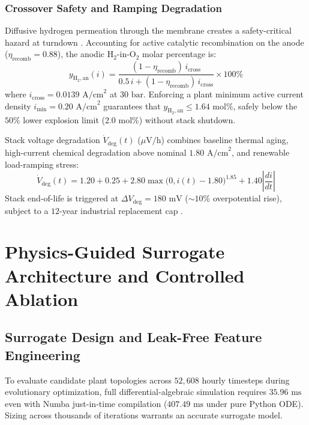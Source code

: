 \documentclass[conference]{IEEEtran}
\begin{document}
\subsubsection{Crossover Safety and Ramping Degradation}
Diffusive hydrogen permeation through the membrane creates a safety-critical hazard at turndown \cite{trinke2018}. Accounting for active catalytic recombination on the anode ($\eta_{\text{recomb}} = 0.88$), the anodic $\text{H}_2$-in-$\text{O}_2$ molar percentage is:
\begin{equation}
y_{\text{H}_2,\text{an}}(i) = \frac{(1 - \eta_{\text{recomb}})\, i_{\text{cross}}}{0.5\, i + (1 - \eta_{\text{recomb}})\, i_{\text{cross}}} \times 100\%
\end{equation}
where $i_{\text{cross}} = 0.0139\text{ A/cm}^2$ at $30\text{ bar}$. Enforcing a plant minimum active current density $i_{\min} = 0.20\text{ A/cm}^2$ guarantees that $y_{\text{H}_2,\text{an}} \le 1.64\text{ mol\%}$, safely below the $50\%$ lower explosion limit ($2.0\text{ mol\%}$) without stack shutdown.

Stack voltage degradation $\dot{V}_{\text{deg}}(t)$ ($\mu\text{V/h}$) combines baseline thermal aging, high-current chemical degradation above nominal $1.80\text{ A/cm}^2$, and renewable load-ramping stress:
\begin{equation}
\dot{V}_{\text{deg}}(t) = 1.20 + 0.25 + 2.80\max\!\big(0, i(t) - 1.80\big)^{1.85} + 1.40\left|\frac{di}{dt}\right|
\end{equation}
Stack end-of-life is triggered at $\Delta V_{\text{deg}} = 180\text{ mV}$ ($\sim 10\%$ overpotential rise), subject to a $12$-year industrial replacement cap \cite{chandesris2015}.

\section{Physics-Guided Surrogate Architecture and Controlled Ablation}

\subsection{Surrogate Design and Leak-Free Feature Engineering}
To evaluate candidate plant topologies across $52,608$ hourly timesteps during evolutionary optimization, full differential-algebraic simulation requires $35.96\text{ ms}$ even with Numba just-in-time compilation ($407.49\text{ ms}$ under pure Python ODE). Sizing across thousands of iterations warrants an accurate surrogate model.
\end{document}
